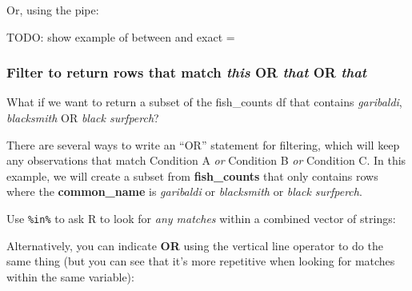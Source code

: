 \documentclass[]{book}
\newenvironment{Shaded}{\begin{snugshade}}{\end{snugshade}}
\newcommand{\DecValTok}[1]{\textcolor[rgb]{0.00,0.00,0.81}{#1}}
\newcommand{\KeywordTok}[1]{\textcolor[rgb]{0.13,0.29,0.53}{\textbf{#1}}}
\newcommand{\NormalTok}[1]{#1}
\newcommand{\OperatorTok}[1]{\textcolor[rgb]{0.81,0.36,0.00}{\textbf{#1}}}
\newcommand{\StringTok}[1]{\textcolor[rgb]{0.31,0.60,0.02}{#1}}
\begin{document}
Or, using the pipe:

\begin{Shaded}
\end{Shaded}

TODO: show example of between and exact =

\hypertarget{filter-to-return-rows-that-match-this-or-that-or-that}{%
\subsubsection{\texorpdfstring{Filter to return rows that match \emph{this} OR \emph{that} OR \emph{that}}{Filter to return rows that match this OR that OR that}}\label{filter-to-return-rows-that-match-this-or-that-or-that}}

What if we want to return a subset of the fish\_counts df that contains \emph{garibaldi}, \emph{blacksmith} OR \emph{black surfperch}?

There are several ways to write an ``OR'' statement for filtering, which will keep any observations that match Condition A \emph{or} Condition B \emph{or} Condition C. In this example, we will create a subset from \textbf{fish\_counts} that only contains rows where the \textbf{common\_name} is \emph{garibaldi} or \emph{blacksmith} or \emph{black surfperch}.

Use \texttt{\%in\%} to ask R to look for \emph{any matches} within a combined vector of strings:

\begin{Shaded}
\end{Shaded}

Alternatively, you can indicate \textbf{OR} using the vertical line operator \texttt{\textbar{}} to do the same thing (but you can see that it's more repetitive when looking for matches within the same variable):
\end{document}
